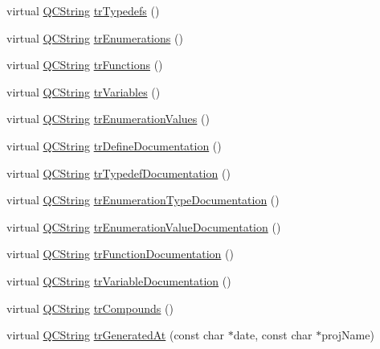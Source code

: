 \begin{DoxyCompactItemize}
virtual \hyperlink{class_q_c_string}{Q\+C\+String} \hyperlink{class_translator_norwegian_a29f0d7815f5545b1acfad460aa478cf2}{tr\+Typedefs} ()
\item 
virtual \hyperlink{class_q_c_string}{Q\+C\+String} \hyperlink{class_translator_norwegian_a6609a383fdb0f2ef8b09391179278228}{tr\+Enumerations} ()
\item 
virtual \hyperlink{class_q_c_string}{Q\+C\+String} \hyperlink{class_translator_norwegian_ae28c16bf5b7efce585aeb78167c7e36a}{tr\+Functions} ()
\item 
virtual \hyperlink{class_q_c_string}{Q\+C\+String} \hyperlink{class_translator_norwegian_a4ff9a3e4beb96de99947fff437bf5030}{tr\+Variables} ()
\item 
virtual \hyperlink{class_q_c_string}{Q\+C\+String} \hyperlink{class_translator_norwegian_a25ce99a57816bd75886f407659c237e3}{tr\+Enumeration\+Values} ()
\item 
virtual \hyperlink{class_q_c_string}{Q\+C\+String} \hyperlink{class_translator_norwegian_ae61cb9a7ba62824659649b33da0dfe0d}{tr\+Define\+Documentation} ()
\item 
virtual \hyperlink{class_q_c_string}{Q\+C\+String} \hyperlink{class_translator_norwegian_ac018e7af9b956f72f75b84c51821ae4a}{tr\+Typedef\+Documentation} ()
\item 
virtual \hyperlink{class_q_c_string}{Q\+C\+String} \hyperlink{class_translator_norwegian_a62cf7f9780edc2581dbf3c73697bfca6}{tr\+Enumeration\+Type\+Documentation} ()
\item 
virtual \hyperlink{class_q_c_string}{Q\+C\+String} \hyperlink{class_translator_norwegian_a8a78fa35b2c327c01b83fc6632a846f8}{tr\+Enumeration\+Value\+Documentation} ()
\item 
virtual \hyperlink{class_q_c_string}{Q\+C\+String} \hyperlink{class_translator_norwegian_a5de6dadf1f0aa1b2b520f42555b87aad}{tr\+Function\+Documentation} ()
\item 
virtual \hyperlink{class_q_c_string}{Q\+C\+String} \hyperlink{class_translator_norwegian_a79c01604daaf2eb75f6a53d45abfed9e}{tr\+Variable\+Documentation} ()
\item 
virtual \hyperlink{class_q_c_string}{Q\+C\+String} \hyperlink{class_translator_norwegian_a78c133664ddcd9b886e4fd65be643e93}{tr\+Compounds} ()
\item 
virtual \hyperlink{class_q_c_string}{Q\+C\+String} \hyperlink{class_translator_norwegian_adf8ef23ac98bd9415011c87683878ade}{tr\+Generated\+At} (const char $\ast$date, const char $\ast$proj\+Name)
\item 

\end{DoxyCompactItemize}
